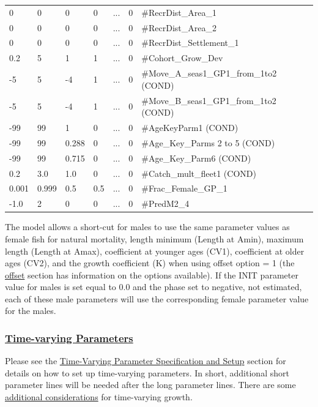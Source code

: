 \begin{longtable}{p{1.1cm} p{1.1cm} p{1.1cm} p{1.1cm} p{1.5cm} p{1.1cm} p{6.75cm}}
	 0   & 0    & 0    & 0    & \multicolumn{1}{c}{...} & 0 & \#RecrDist\_Area\_1 \\
	 0   & 0    & 0    & 0    & \multicolumn{1}{c}{...} & 0 & \#RecrDist\_Area\_2 \\
	 0   & 0    & 0    & 0    & \multicolumn{1}{c}{...} & 0 & \#RecrDist\_Settlement\_1 \\
	 0.2 & 5    & 1    & 1    & \multicolumn{1}{c}{...} & 0 & \#Cohort\_Grow\_Dev \\
	-5   & 5    & -4   & 1    & \multicolumn{1}{c}{...} & 0 & \#Move\_A\_seas1\_GP1\_from\_1to2 (COND) \\
    -5   & 5    & -4   & 1    & \multicolumn{1}{c}{...} & 0 & \#Move\_B\_seas1\_GP1\_from\_1to2 (COND) \\
	-99  & 99   &  1   & 0    & \multicolumn{1}{c}{...} & 0 & \#AgeKeyParm1 (COND) \\
	-99  & 99   & 0.288 &  0  &...& 0 & \#Age\_Key\_Parms 2 to 5 (COND) \\
	-99  & 99   & 0.715 &  0  &...& 0 & \#Age\_Key\_Parm6 (COND) \\	
	0.2  & 3.0  & 1.0   &  0  &...& 0 & \#Catch\_mult\_fleet1 (COND) \\
	0.001 & 0.999 & 0.5 & 0.5 &...& 0 & \#Frac\_Female\_GP\_1 \\
	-1.0 & 2 & 0 & 0    &...& 0 & \#PredM2\_4 \Bstrut\\		
	\hline
\end{longtable}

\hypertarget{male-shortcut}{}
The model allows a short-cut for males to use the same parameter values as female fish for natural mortality, length minimum (Length at Amin), maximum length (Length at Amax), coefficient at younger ages (CV1), coefficient at older ages (CV2), and the growth coefficient (K) when using offset option = 1 (the \hyperlink{offset}{offset} section has information on the options available). If the INIT parameter value for males is set equal to 0.0 and the phase set to negative, not estimated, each of these male parameters will use the corresponding female parameter value for the males.

\hypertarget{TVParams}{}
\subsubsection[Time-varying Parameters]{\protect\hyperlink{TVParams}{Time-varying Parameters}}
Please see the \hyperlink{tvOrder}{Time-Varying Parameter Specification and Setup} section for details on how to set up time-varying parameters. In short, additional short parameter lines will be needed after the long parameter lines. There are some \hyperlink{tvgrowth}{additional considerations} for time-varying growth.

